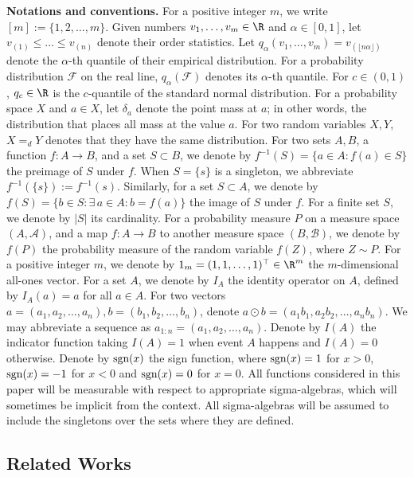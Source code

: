 \documentclass[english]{article}
\begin{document}
{\bf Notations and conventions.}
For a positive integer $m$, we write $[m]:=\{1,2,\ldots,m\}$.
Given numbers $v_1,\ldots, v_m \in \R$ and $\alpha\in[0,1]$,
let $v_{(1)} \leq \ldots \leq v_{(n)}$ 
denote their order statistics.
Let $q_{\alpha}(v_1,\ldots, v_m) = v_{(\lfloor n\alpha \rfloor)}$ 
denote 
the $\alpha$-th quantile of their empirical distribution. For a probability distribution $\mathcal{F}$ on the real line, $q_{\alpha}(\mathcal{F})$ denotes its $\alpha$-th quantile.
For $c\in (0,1)$, 
$q_{c} \in \R$ is the $c$-quantile of the standard normal distribution.
For a probability space $X$ and $a\in X$, let $\delta_a$ denote the point mass at $a$; in other words, the distribution that places all mass at the value $a$.
For two random variables $X,Y$, $X=_dY$ denotes that they have the same distribution.
For two sets $A,B$, a function $f:A\to B$, and a set $S \subset B$, we denote by $f^{-1}(S) = \{a\in A: f(a)\in S\}$ the preimage of $S$ under $f$. 
When $S = \{s\}$ is a singleton, we abbreviate $f^{-1}(\{s\}):=f^{-1}(s)$.
Similarly, for a set $S \subset A$, we denote by $f(S) = \{b\in S: \exists\, a\in A: b = f(a)\}$ the image of $S$ under $f$.
For a finite set $S$, we denote by $|S|$ its cardinality.
For a probability measure $P$ on a measure space $(A,\mathcal{A})$, and a map $f: A\to B$ to another measure space $(B,\mathcal{B})$, we denote by $f(P)$ the probability measure of the random variable $f(Z)$, where $Z\sim P$.
For a positive integer $m$, we denote by $1_m = (1,1,\ldots,1)^\top \in \R^m$ the $m$-dimensional all-ones vector.
For a set $A$, we denote by $I_A$ the identity operator on $A$, defined by $I_A(a)=a$ for all $a\in A$.
For two vectors $a=(a_1,a_2,\ldots,a_n), b = (b_1,b_2,\ldots,b_n)$, denote $a \odot b = (a_1b_1,a_2b_2,\ldots,a_nb_n)$. 
We may abbreviate a sequence as $a_{1:n}=(a_1,a_2,\ldots,a_n)$.
Denote by $I(A)$ the indicator function taking $I(A)=1$ when event $A$ happens and $I(A)=0$ otherwise. 
Denote by $\textnormal{sgn}(x)$ the sign function, where $\textnormal{sgn}(x) = 1$ for $x>0$, $\textnormal{sgn}(x) = -1 $ for $x<0$ and $\textnormal{sgn}(x) =0 $ for $x = 0$.
All functions considered in this paper will be measurable with respect to appropriate sigma-algebras, which will sometimes be implicit from the context.
All sigma-algebras will be assumed to include the singletons over the sets where they are defined.

\subsection{Related Works}\label{sec:related-work}
\end{document}
